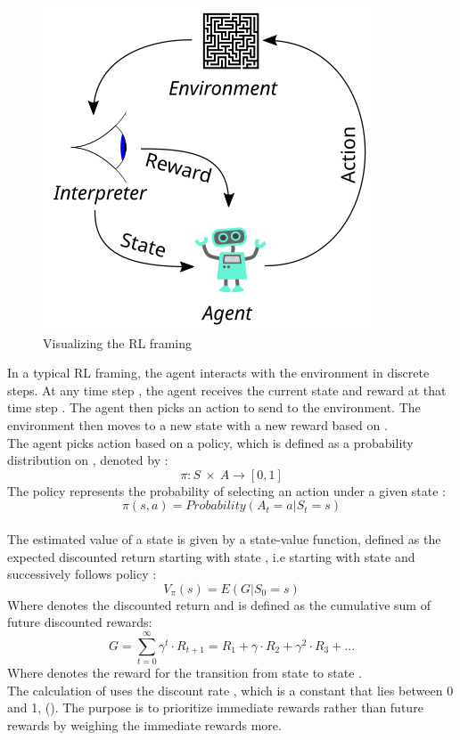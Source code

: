 \documentclass[a4paper]{article}
\begin{document}
    \begin{figure}
        \centering
        \includegraphics[scale = 0.4]{Image/RL_diagram.png}
        \caption{Visualizing the RL framing}
    \end{figure}
    \vspace{0.2cm}
    In a typical RL framing, the agent interacts with the environment in discrete steps. At any time step , the agent receives the current state  and reward at that time step . The agent then picks an action  to send to the environment. The environment then moves to a new state  with a new reward  based on . 
    \vspace{0.2cm}\\
    The agent picks action based on a policy, which is defined as a probability distribution on , denoted by \boldmath{$\pi$}: 
        \[\pi: S\ \times\ A \to [0, 1]\] 
    The policy represents the probability of selecting an action  under a given state : 
        \[\pi(s, a) = Probability(A_t = a | S_t = s)\] 
    \\
    The estimated value of a state is given by a state-value function, defined as the expected discounted return starting with state , i.e starting with state  and successively follows policy \boldmath{$\pi$}: 
        \[V_{\pi}(s) = E(G | S_0 = s)\]
    Where  denotes the discounted return and is defined as the cumulative sum of future discounted rewards: 
        \[G = \sum_{t=0}^{\infty} \gamma^t \cdot R_{t+1} = R_1 + \gamma \cdot R_2 + \gamma^2 \cdot R_3 + ...\] 
    Where  denotes the reward for the transition from state  to state .
    \\
    The calculation of  uses the discount rate \boldmath{$\gamma$}, which is a constant that lies between 0 and 1, (\boldmath{$\gamma \in [0, 1)$}). The purpose is to prioritize immediate rewards rather than future rewards by weighing the immediate rewards more.
    
\end{document}
